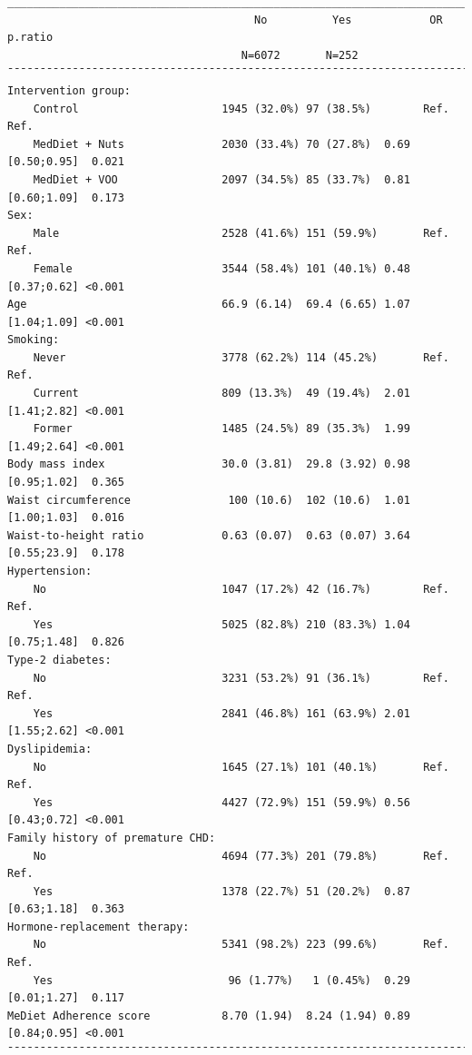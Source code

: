 \documentclass[
]{book}
\begin{document}
\begin{verbatim}
__________________________________________________________________________________ 
                                      No          Yes            OR        p.ratio 
                                    N=6072       N=252                             
¯¯¯¯¯¯¯¯¯¯¯¯¯¯¯¯¯¯¯¯¯¯¯¯¯¯¯¯¯¯¯¯¯¯¯¯¯¯¯¯¯¯¯¯¯¯¯¯¯¯¯¯¯¯¯¯¯¯¯¯¯¯¯¯¯¯¯¯¯¯¯¯¯¯¯¯¯¯¯¯¯¯ 
Intervention group:                                                                
    Control                      1945 (32.0%) 97 (38.5%)        Ref.        Ref.   
    MedDiet + Nuts               2030 (33.4%) 70 (27.8%)  0.69 [0.50;0.95]  0.021  
    MedDiet + VOO                2097 (34.5%) 85 (33.7%)  0.81 [0.60;1.09]  0.173  
Sex:                                                                               
    Male                         2528 (41.6%) 151 (59.9%)       Ref.        Ref.   
    Female                       3544 (58.4%) 101 (40.1%) 0.48 [0.37;0.62] <0.001  
Age                              66.9 (6.14)  69.4 (6.65) 1.07 [1.04;1.09] <0.001  
Smoking:                                                                           
    Never                        3778 (62.2%) 114 (45.2%)       Ref.        Ref.   
    Current                      809 (13.3%)  49 (19.4%)  2.01 [1.41;2.82] <0.001  
    Former                       1485 (24.5%) 89 (35.3%)  1.99 [1.49;2.64] <0.001  
Body mass index                  30.0 (3.81)  29.8 (3.92) 0.98 [0.95;1.02]  0.365  
Waist circumference               100 (10.6)  102 (10.6)  1.01 [1.00;1.03]  0.016  
Waist-to-height ratio            0.63 (0.07)  0.63 (0.07) 3.64 [0.55;23.9]  0.178  
Hypertension:                                                                      
    No                           1047 (17.2%) 42 (16.7%)        Ref.        Ref.   
    Yes                          5025 (82.8%) 210 (83.3%) 1.04 [0.75;1.48]  0.826  
Type-2 diabetes:                                                                   
    No                           3231 (53.2%) 91 (36.1%)        Ref.        Ref.   
    Yes                          2841 (46.8%) 161 (63.9%) 2.01 [1.55;2.62] <0.001  
Dyslipidemia:                                                                      
    No                           1645 (27.1%) 101 (40.1%)       Ref.        Ref.   
    Yes                          4427 (72.9%) 151 (59.9%) 0.56 [0.43;0.72] <0.001  
Family history of premature CHD:                                                   
    No                           4694 (77.3%) 201 (79.8%)       Ref.        Ref.   
    Yes                          1378 (22.7%) 51 (20.2%)  0.87 [0.63;1.18]  0.363  
Hormone-replacement therapy:                                                       
    No                           5341 (98.2%) 223 (99.6%)       Ref.        Ref.   
    Yes                           96 (1.77%)   1 (0.45%)  0.29 [0.01;1.27]  0.117  
MeDiet Adherence score           8.70 (1.94)  8.24 (1.94) 0.89 [0.84;0.95] <0.001  
¯¯¯¯¯¯¯¯¯¯¯¯¯¯¯¯¯¯¯¯¯¯¯¯¯¯¯¯¯¯¯¯¯¯¯¯¯¯¯¯¯¯¯¯¯¯¯¯¯¯¯¯¯¯¯¯¯¯¯¯¯¯¯¯¯¯¯¯¯¯¯¯¯¯¯¯¯¯¯¯¯¯ 
\end{verbatim}
\end{document}
